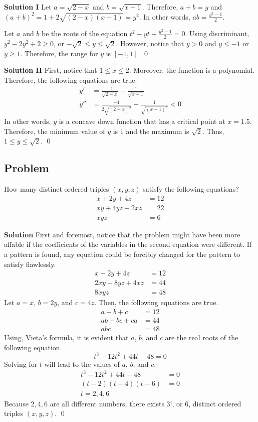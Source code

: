 \documentclass{article}
\newenvironment{solution}{\begin{trivlist}\item[]{\bf Solution}}{\qed \end{trivlist}}
\begin{document}
\textbf{Solution I}
Let $a = \sqrt{2 - x}$ and $b = \sqrt{x - 1}$.
Therefore, $a + b = y$ and $(a + b)^2 =
1 + 2\sqrt{(2 - x)(x - 1)} = y^2$. In other words,
$ab = \frac{y^2 - 1}{2}$.

Let $a$ and $b$ be the roots of the equation
$t^2 - yt + \frac{y^2 - 1}{2} = 0$. Using discriminant,
$y^2 - 2y^2 + 2 \geq 0$, or $-\sqrt{2} \leq y \leq \sqrt{2}$.
However, notice that $y > 0$ and $y \leq -1$ or $y \geq 1$.
Therefore, the range for $y$ is $\boxed{[-1, 1]}$.
\qed


\textbf{Solution II}
First, notice that $1 \leq x \leq 2$. Moreover, the function
is a polynomial. Therefore, the following equations are true.
\begin{align*}
    y' &= \frac{-1}{\sqrt{2 - x}} + \frac{1}{\sqrt{x - 1}} \\
    y'' &= \frac{-1}{2\sqrt{(2 - x)^3}}
        - \frac{1}{\sqrt{(x - 1)^3}}
        < 0
\end{align*}
In other words, $y$ is a concave down function that has
a critical point at $x = 1.5$. Therefore, the minimum
value of $y$ is $1$ and the maximum is $\sqrt{2}$. Thus,
$\boxed{1 \leq y \leq \sqrt{2}}$.
\qed

\subsection*{Problem}
How many distinct ordered triples $(x, y, z)$ satisfy
the following equations?
\begin{align*}
    x + 2y + 4z &= 12 \\
    xy + 4yz + 2xz &= 22 \\
    xyz &= 6
\end{align*}
\begin{solution}
First and foremost, notice that the problem might have
been more affable if the coefficients of the variables
in the second equation were different. If a pattern is
found, any equation could be forcibly changed for the
pattern to satisfy flawlessly.
\begin{align*}
    x + 2y + 4z &= 12 \\
    2xy + 8yz + 4xz &= 44 \\
    8xyz &= 48
\end{align*}
Let $a = x$, $b = 2y$, and $c = 4z$. Then, the following
equations are true.
\begin{align*}
    a + b + c &= 12 \\
    ab + bc + ca &= 44 \\
    abc &= 48
\end{align*}
Using, Vieta's formula, it is evident that $a$, $b$, and
$c$ are the real roots of the following equation.
\[
t^3 - 12t^2 + 44t - 48 = 0
\]
Solving for $t$ will lead to the values of $a$, $b$, and $c$.
\begin{align*}
    t^3 - 12t^2 + 44t - 48 &= 0 \\
    (t - 2)(t - 4)(t - 6) &= 0 \\
    t = 2, 4, 6
\end{align*}
Because $2, 4, 6$ are all different numbers, there exists
$3!$, or $\boxed{6}$, distinct ordered triples $(x, y, z)$.
\end{solution}
\end{document}
